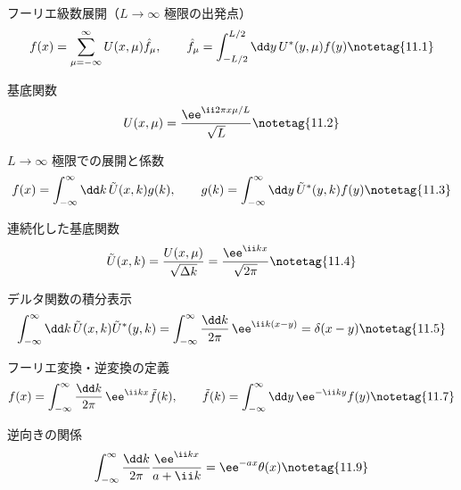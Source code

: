 \documentclass[uplatex,dvipdfmx,a4paper,11pt]{jsarticle}
\begin{document}
\begin{kirokuichiran}
\end{kirokuichiran}

\youtenseiri
\begin{noteshikilist}
  \item フーリエ級数展開（$L\to\infty$ 極限の出発点） %
    \[ f(x)=\sum_{\mu=-\infty}^{\infty}U(x,\mu)\hat f_\mu,\qquad \hat f_\mu=\int_{-L/2}^{L/2}\dd y\,U^{*}(y,\mu)f(y) \notetag{11.1} \]
  \item 基底関数 %
    \[ U(x,\mu)=\frac{\ee^{\ii2\pi x\mu/L}}{\sqrt{L}} \notetag{11.2} \]
  \item $L\to\infty$ 極限での展開と係数 %
    \[ f(x)=\int_{-\infty}^{\infty}\dd k\,\tilde U(x,k)g(k),\qquad g(k)=\int_{-\infty}^{\infty}\dd y\,\tilde U^{*}(y,k)f(y) \notetag{11.3} \]
  \item 連続化した基底関数 %
    \[ \tilde U(x,k)=\frac{U(x,\mu)}{\sqrt{\Delta k}}=\frac{\ee^{\ii kx}}{\sqrt{2\pi}} \notetag{11.4} \]
  \item デルタ関数の積分表示 %
    \[ \int_{-\infty}^{\infty}\dd k\,\tilde U(x,k)\tilde U^{*}(y,k)=\int_{-\infty}^{\infty}\frac{\dd k}{2\pi}\,\ee^{\ii k(x-y)}=\delta(x-y) \notetag{11.5} \]
  \item フーリエ変換・逆変換の定義 %
    \[ f(x)=\int_{-\infty}^{\infty}\frac{\dd k}{2\pi}\,\ee^{\ii kx}\tilde f(k),\qquad \tilde f(k)=\int_{-\infty}^{\infty}\dd y\,\ee^{-\ii ky}f(y) \notetag{11.7} \]
  \item 逆向きの関係 %
    \[ \int_{-\infty}^{\infty}\frac{\dd k}{2\pi}\frac{\ee^{\ii kx}}{a+\ii k}=\ee^{-ax}\theta(x) \notetag{11.9} \]
\end{noteshikilist}
\end{document}
